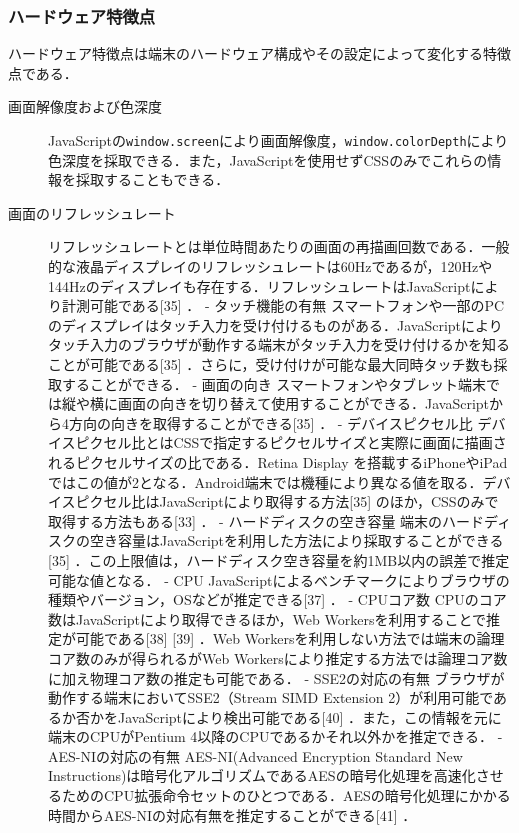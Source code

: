 \subsubsection{ハードウェア特徴点}
ハードウェア特徴点は端末のハードウェア構成やその設定によって変化する特徴点である．
\begin{description}
\item[画面解像度および色深度]JavaScriptの\texttt{window.screen}により画面解像度，\texttt{window.colorDepth}により色深度を採取できる．また，JavaScriptを使用せずCSSのみでこれらの情報を採取することもできる．
\item[画面のリフレッシュレート]リフレッシュレートとは単位時間あたりの画面の再描画回数である．一般的な液晶ディスプレイのリフレッシュレートは60Hzであるが，120Hzや144Hzのディスプレイも存在する．リフレッシュレートはJavaScriptにより計測可能である[35] ．
-	タッチ機能の有無
スマートフォンや一部のPCのディスプレイはタッチ入力を受け付けるものがある．JavaScriptによりタッチ入力のブラウザが動作する端末がタッチ入力を受け付けるかを知ることが可能である[35] ．さらに，受け付けが可能な最大同時タッチ数も採取することができる．
-	画面の向き
スマートフォンやタブレット端末では縦や横に画面の向きを切り替えて使用することができる．JavaScriptから4方向の向きを取得することができる[35] ．
-	デバイスピクセル比
デバイスピクセル比とはCSSで指定するピクセルサイズと実際に画面に描画されるピクセルサイズの比である．Retina Display を搭載するiPhoneやiPadではこの値が2となる．Android端末では機種により異なる値を取る．デバイスピクセル比はJavaScriptにより取得する方法[35] のほか，CSSのみで取得する方法もある[33] ． 
-	ハードディスクの空き容量
端末のハードディスクの空き容量はJavaScriptを利用した方法により採取することができる[35] ．この上限値は，ハードディスク空き容量を約1MB以内の誤差で推定可能な値となる．
-	CPU
JavaScriptによるベンチマークによりブラウザの種類やバージョン，OSなどが推定できる[37] ．
-	CPUコア数
CPUのコア数はJavaScriptにより取得できるほか，Web Workersを利用することで推定が可能である[38] [39] ．Web Workersを利用しない方法では端末の論理コア数のみが得られるがWeb Workersにより推定する方法では論理コア数に加え物理コア数の推定も可能である．
-	SSE2の対応の有無
ブラウザが動作する端末においてSSE2（Stream SIMD Extension 2）が利用可能であるか否かをJavaScriptにより検出可能である[40] ．また，この情報を元に端末のCPUがPentium 4以降のCPUであるかそれ以外かを推定できる．
-	AES-NIの対応の有無
AES-NI(Advanced Encryption Standard New Instructions)は暗号化アルゴリズムであるAESの暗号化処理を高速化させるためのCPU拡張命令セットのひとつである．AESの暗号化処理にかかる時間からAES-NIの対応有無を推定することができる[41] ．

\end{description}
